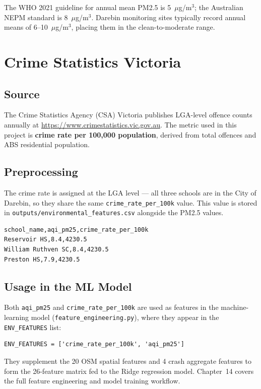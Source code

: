 \documentclass[11pt,a4paper,openany]{book}
\begin{document}
The WHO 2021 guideline for annual mean PM2.5 is 5~$\mu$g/m$^3$; the Australian NEPM standard is 8~$\mu$g/m$^3$. Darebin monitoring sites typically record annual means of 6--10~$\mu$g/m$^3$, placing them in the clean-to-moderate range.

\section{Crime Statistics Victoria}

\subsection{Source}

The Crime Statistics Agency (CSA) Victoria publishes LGA-level offence counts annually at \url{https://www.crimestatistics.vic.gov.au}. The metric used in this project is \textbf{crime rate per 100,000 population}, derived from total offences and ABS residential population.

\subsection{Preprocessing}

The crime rate is assigned at the LGA level --- all three schools are in the City of Darebin, so they share the same \texttt{crime\_rate\_per\_100k} value. This value is stored in \texttt{outputs/environmental\_features.csv} alongside the PM2.5 values.

\begin{lstlisting}[style=text]
school_name,aqi_pm25,crime_rate_per_100k
Reservoir HS,8.4,4230.5
William Ruthven SC,8.4,4230.5
Preston HS,7.9,4230.5
\end{lstlisting}

\subsection{Usage in the ML Model}

Both \texttt{aqi\_pm25} and \texttt{crime\_rate\_per\_100k} are used as features in the machine-learning model (\texttt{feature\_engineering.py}), where they appear in the \texttt{ENV\_FEATURES} list:

\begin{lstlisting}[style=python]
ENV_FEATURES = ['crime_rate_per_100k', 'aqi_pm25']
\end{lstlisting}

They supplement the 20 OSM spatial features and 4 crash aggregate features to form the 26-feature matrix fed to the Ridge regression model. Chapter~14 covers the full feature engineering and model training workflow.
\end{document}

